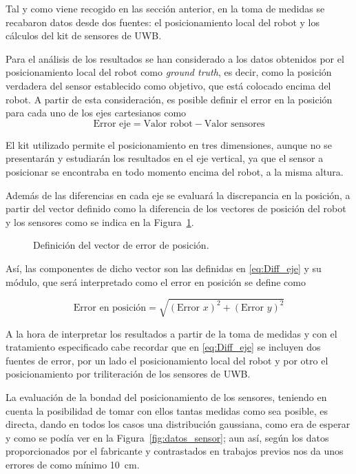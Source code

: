 Tal y como viene recogido en las sección anterior, en la toma de medidas se recabaron datos desde dos fuentes: el posicionamiento local del robot y los cálculos del kit de sensores de UWB.

Para el análisis de los resultados se han considerado a los datos obtenidos por el posicionamiento local del robot como \textit{ground truth}, es decir, como la posición verdadera del sensor establecido como objetivo, que está colocado encima del robot.
A partir de esta consideración, es posible definir el error en la posición para cada uno de los ejes cartesianos como
\begin{equation}\label{eq:Diff_eje}
    \text{Error eje} = \text{Valor robot} - \text{Valor sensores}
\end{equation}

El kit utilizado permite el posicionamiento en tres dimensiones, aunque no se presentarán y estudiarán los resultados en el eje vertical, ya que el sensor a posicionar se encontraba en todo momento encima del robot, a la misma altura.

Además de las diferencias en cada eje se evaluará la discrepancia en la posición, a partir del vector definido como la diferencia de los vectores de posición del robot y los sensores como se indica en la Figura~\ref{fig:diff_pos}.
\begin{figure}[H]
    \centering
    
    \caption{Definición del vector de error de posición.}
    \label{fig:diff_pos}
\end{figure}

Así, las componentes de dicho vector son las definidas en \eqref{eq:Diff_eje} y su módulo, que será interpretado como el error en posición se define como

\begin{equation}\label{eq:vec_pos}
    \text{Error en posición} = \sqrt{(\text{Error } x)^2 + (\text{Error } y)^2}
\end{equation}

A la hora de interpretar los resultados a partir de la toma de medidas y con el tratamiento especificado cabe recordar que en \eqref{eq:Diff_eje} se incluyen dos fuentes de error, por un lado el posicionamiento local del robot y por otro el posicionamiento por triliteración de los sensores de UWB.

La evaluación de la bondad del posicionamiento de los sensores, teniendo en cuenta la posibilidad de tomar con ellos tantas medidas como sea posible, es directa, dando en todos los casos una distribución gaussiana, como era de esperar y como se podía ver en la Figura~\ref{fig:datos_sensor}; aun así, según los datos proporcionados por el fabricante y contrastados en trabajos previos nos da unos errores de como mínimo 10~cm.

